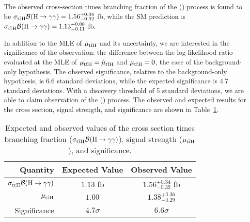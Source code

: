 The observed cross-section times branching fraction of the \ttH (\Hgg) process is found to be $\sigma_{\mathrm{t\bar{t}H}} \mathcal B(\text{H} \to \gamma \gamma) = 1.56^{+0.34}_{-0.32}$ fb, while the SM prediction is $\sigma_{\mathrm{t\bar{t}H}} \mathcal B(\text{H} \to \gamma \gamma) = 1.13^{+0.08}_{-0.11}$ fb.

In addition to the MLE of $\mu_{\mathrm{t\bar{t}H}}$ and its uncertainty, we are interested in the significance of the observation: the difference between the log-likelihood ratio evaluated at the MLE of $\mu_{\mathrm{t\bar{t}H}} = \hat{\mu}_{\mathrm{t\bar{t}H}}$ and $\mu_{\mathrm{t\bar{t}H}} = 0$, the case of the background-only hypothesis.
The observed significance, relative to the background-only hypothesis, is 6.6 standard deviations, while the expected significance is 4.7 standard deviations.
With a discovery threshold of 5 standard deviations, we are able to claim observation of the \ttH (\Hgg) process.
The observed and expected results for the cross section, signal strength, and significance are shown in Table~\ref{tab:tth_results}.
\begin{table} [htbp!]
    \centering
    \begin{tabular}{r c c} \hline \hline
        Quantity & Expected Value & Observed Value \\ \hline
        $\sigma_{\mathrm{t\bar{t}H}} \mathcal B(\text{H} \to \gamma \gamma)$ & $1.13$ fb & $1.56^{+0.34}_{-0.32}$ fb \\
        $\mu_{\mathrm{t\bar{t}H}}$ & $1.00$ & $1.38^{+0.36}_{-0.29}$ \\
        Significance & $4.7\sigma$ & $6.6\sigma$ \\ \hline \hline
    \end{tabular}
    \caption{Expected and observed values of the cross section times branching fraction ($\sigma_{\mathrm{t\bar{t}H}} \mathcal B(\text{H} \to \gamma \gamma)$), signal strength ($\mu_{\mathrm{t\bar{t}H}}$), and significance.}
    \label{tab:tth_results}
\end{table}

